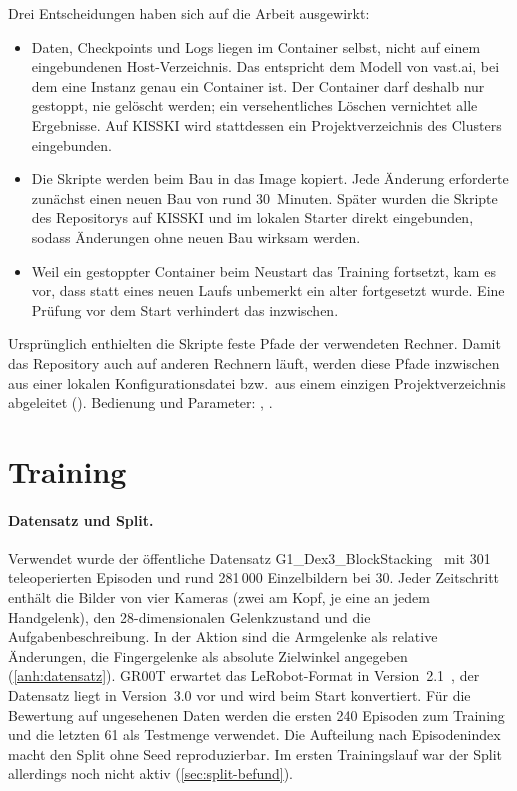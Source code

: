 Drei Entscheidungen haben sich auf die Arbeit ausgewirkt:

\begin{itemize}
  \item Daten, Checkpoints und Logs liegen im Container selbst, nicht auf einem
    eingebundenen Host-Verzeichnis. Das entspricht dem Modell von vast.ai, bei
    dem eine Instanz genau ein Container ist. Der Container darf deshalb nur
    gestoppt, nie gelöscht werden; ein versehentliches Löschen vernichtet alle
    Ergebnisse. Auf KISSKI wird stattdessen ein Projektverzeichnis des
    Clusters eingebunden.
  \item Die Skripte werden beim Bau in das Image kopiert. Jede Änderung
    erforderte zunächst einen neuen Bau von rund 30~Minuten. Später wurden die
    Skripte des Repositorys auf KISSKI und im lokalen Starter direkt
    eingebunden, sodass Änderungen ohne neuen Bau wirksam werden.
  \item Weil ein gestoppter Container beim Neustart das Training fortsetzt,
    kam es vor, dass statt eines neuen Laufs unbemerkt ein alter fortgesetzt
    wurde. Eine Prüfung vor dem Start verhindert das inzwischen.
\end{itemize}

Ursprünglich enthielten die Skripte feste Pfade der verwendeten Rechner.
Damit das Repository auch auf anderen Rechnern läuft, werden diese Pfade
inzwischen aus einer lokalen Konfigurationsdatei bzw.\ aus einem einzigen
Projektverzeichnis abgeleitet (). Bedienung und
Parameter: , .

\section{Training}
\label{sec:training}
\label{sec:datensatz}
\label{sec:trainingsverfahren}

\paragraph{Datensatz und Split.}
Verwendet wurde der öffentliche Datensatz
G1\_Dex3\_BlockStacking~\cite{g1dex3dataset} mit 301 teleoperierten Episoden
und rund 281\,000 Einzelbildern bei \qty{30}{\fps}. Jeder Zeitschritt enthält
die Bilder von vier Kameras (zwei am Kopf, je eine an jedem Handgelenk), den
28-dimensionalen Gelenkzustand und die Aufgabenbeschreibung. In der Aktion
sind die Armgelenke als relative Änderungen, die Fingergelenke als absolute
Zielwinkel angegeben (\cref{anh:datensatz}). GR00T erwartet das LeRobot-Format
in Version~2.1~\cite{lerobot2024}, der Datensatz liegt in Version~3.0 vor und
wird beim Start konvertiert. Für die Bewertung auf ungesehenen Daten werden
die ersten 240 Episoden zum Training und die letzten 61 als Testmenge
verwendet. Die Aufteilung nach Episodenindex macht den Split ohne Seed
reproduzierbar. Im ersten Trainingslauf war der Split allerdings noch nicht
aktiv (\cref{sec:split-befund}).

